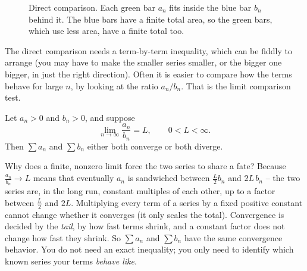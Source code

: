 \begin{figure}[htbp]
\centering
{}
\caption{Direct comparison. Each green bar $a_n$ fits inside the blue bar $b_n$ behind it. The blue bars have a finite total area, so the green bars, which use less area, have a finite total too.}
\label{ch29:fig-comparison}
\end{figure}

The direct comparison needs a term-by-term inequality, which can be fiddly to arrange (you may have to make the smaller series smaller, or the bigger one bigger, in just the right direction). Often it is easier to compare how the terms behave for large $n$, by looking at the ratio $a_n/b_n$. That is the limit comparison test.

\begin{theorem}
\label{ch29:thm-limcomparison}
Let $a_n > 0$ and $b_n > 0$, and suppose
\[
\lim_{n\to\infty} \frac{a_n}{b_n} = L, \qquad 0 < L < \infty.
\]
Then $\sum a_n$ and $\sum b_n$ either both converge or both diverge.
\end{theorem}

\begin{whybox}
Why does a finite, nonzero limit force the two series to share a fate? Because $\tfrac{a_n}{b_n}\to L$ means that eventually $a_n$ is sandwiched between $\tfrac{L}{2}b_n$ and $2L\,b_n$ -- the two series are, in the long run, constant multiples of each other, up to a factor between $\tfrac L2$ and $2L$. Multiplying every term of a series by a fixed positive constant cannot change whether it converges (it only scales the total). Convergence is decided by the \emph{tail}, by how fast terms shrink, and a constant factor does not change how fast they shrink. So $\sum a_n$ and $\sum b_n$ have the same convergence behavior. You do not need an exact inequality; you only need to identify which known series your terms \emph{behave like}.
\end{whybox}

